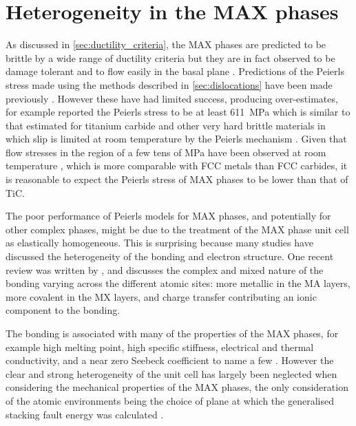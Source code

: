 \chapter{Heterogeneity in the MAX phases}
\label{chap:hetero_max_phases}

\graphicspath{{hetero_max_phases/Figs/}}


As  discussed in \autoref{sec:ductility_criteria}, the MAX phases are predicted to be brittle by a wide range of ductility criteria but they are in fact observed to be damage tolerant and to flow easily in the basal plane \cite{Barsoum1999}.
Predictions of the Peierls stress made using the methods described in \autoref{sec:dislocations} have been made previously \cite{Music2007ductility,Gouriet2015}. However these have had limited success, producing over-estimates, for example \citet{Gouriet2015} reported the Peierls stress to be at least \SI{611}{\mega\pascal} which is similar to  that estimated for titanium carbide and other very hard brittle materials in which slip is limited at room temperature by the Peierls mechanism \cite{Chang1966,Clegg2006,Kamimura2011,Yadav2014}. Given that flow stresses in the region of a few tens of \si{\mega\pascal} have been observed at room temperature \cite{Humphrey2012,Barsoum1999}, which is more comparable with FCC metals than FCC carbides, it is reasonable to expect the Peierls stress of MAX phases to be lower than that of TiC.

The poor performance of Peierls models for MAX phases, and potentially for other complex phases, might be due to the treatment of the MAX phase unit cell as elastically homogeneous. This is surprising because many studies have discussed the heterogeneity of the bonding and electron structure. One recent review was written by \citet{Magnuson2017}, and discusses the complex and mixed nature of the bonding varying across the different atomic sites: more metallic in the MA layers, more covalent in the MX layers, and charge transfer contributing an ionic component to the bonding. 

The bonding is associated with many of the properties of the MAX phases, for example high melting point, high specific stiffness, electrical and thermal conductivity, and a near zero Seebeck coefficient to name a few \cite{Yoo2000,Sun2011,Magnuson2017}. However the clear and strong heterogeneity of the unit cell has largely been neglected when considering the mechanical properties of the MAX phases, the only consideration of the atomic environments  being the choice of plane at which the generalised stacking fault energy was calculated \cite{Music2007ductility}.


